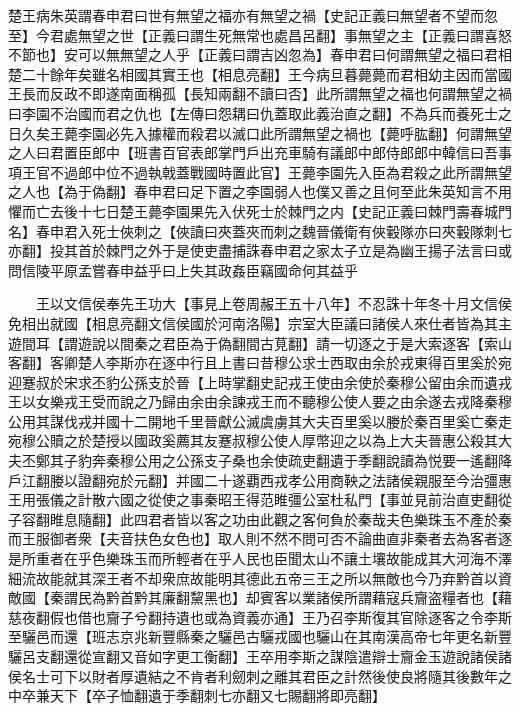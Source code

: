楚王病朱英謂春申君曰世有無望之福亦有無望之禍【史記正義曰無望者不望而忽至】今君處無望之世【正義曰謂生死無常也處昌呂翻】事無望之主【正義曰謂喜怒不節也】安可以無無望之人乎【正義曰謂吉凶忽為】春申君曰何謂無望之福曰君相楚二十餘年矣雖名相國其實王也【相息亮翻】王今病旦暮薨薨而君相幼主因而當國王長而反政不即遂南面稱孤【長知兩翻不讀曰否】此所謂無望之福也何謂無望之禍曰李園不治國而君之仇也【左傳曰怨耦曰仇蓋取此義治直之翻】不為兵而養死士之日久矣王薨李園必先入據權而殺君以滅口此所謂無望之禍也【薨呼肱翻】何謂無望之人曰君置臣郎中【班書百官表郎掌門戶出充車騎有議郎中郎侍郎郎中韓信曰吾事項王官不過郎中位不過執戟蓋戰國時置此官】王薨李園先入臣為君殺之此所謂無望之人也【為于偽翻】春申君曰足下置之李園弱人也僕又善之且何至此朱英知言不用懼而亡去後十七日楚王薨李園果先入伏死士於棘門之内【史記正義曰棘門壽春城門名】春申君入死士俠刺之【俠讀曰夾蓋夾而刺之魏晉儀衛有俠轂隊亦曰夾轂隊刺七亦翻】投其首於棘門之外于是使吏盡捕誅春申君之家太子立是為幽王揚子法言曰或問信陵平原孟嘗春申益乎曰上失其政姦臣竊國命何其益乎

　　王以文信侯奉先王功大【事見上卷周赧王五十八年】不忍誅十年冬十月文信侯免相出就國【相息亮翻文信侯國於河南洛陽】宗室大臣議曰諸侯人來仕者皆為其主遊間耳【謂遊說以間秦之君臣為于偽翻間古莧翻】請一切逐之于是大索逐客【索山客翻】客卿楚人李斯亦在逐中行且上書曰昔穆公求士西取由余於戎東得百里奚於宛迎蹇叔於宋求丕豹公孫支於晉【上時掌翻史記戎王使由余使於秦穆公留由余而遺戎王以女樂戎王受而說之乃歸由余由余諫戎王而不聽穆公使人要之由余遂去戎降秦穆公用其謀伐戎并國十二開地千里晉獻公滅虞虜其大夫百里奚以媵於秦百里奚亡秦走宛穆公贖之於楚授以國政奚薦其友蹇叔穆公使人厚幣迎之以為上大夫晉惠公殺其大夫丕鄭其子豹奔秦穆公用之公孫支子桑也余使疏吏翻遺于季翻說讀為悦要一遙翻降戶江翻媵以證翻宛於元翻】并國二十遂覇西戎孝公用商鞅之法諸侯親服至今治彊惠王用張儀之計散六國之從使之事秦昭王得范睢彊公室杜私門【事並見前治直吏翻從子容翻睢息隨翻】此四君者皆以客之功由此觀之客何負於秦哉夫色樂珠玉不產於秦而王服御者衆【夫音扶色女色也】取人則不然不問可否不論曲直非秦者去為客者逐是所重者在乎色樂珠玉而所輕者在乎人民也臣聞太山不讓土壤故能成其大河海不澤細流故能就其深王者不却衆庶故能明其德此五帝三王之所以無敵也今乃弃黔首以資敵國【秦謂民為黔首黔其廉翻黧黑也】却賓客以業諸侯所謂藉寇兵齎盗糧者也【藉慈夜翻假也借也齎子兮翻持遺也或為資義亦通】王乃召李斯復其官除逐客之令李斯至驪邑而還【班志京兆新豐縣秦之驪邑古驪戎國也驪山在其南漢高帝七年更名新豐驪呂支翻還從宣翻又音如字更工衡翻】王卒用李斯之謀陰遣辯士齎金玉遊說諸侯諸侯名士可下以財者厚遺結之不肯者利劒刺之離其君臣之計然後使良將隨其後數年之中卒兼天下【卒子恤翻遺于季翻刺七亦翻又七賜翻將即亮翻】

